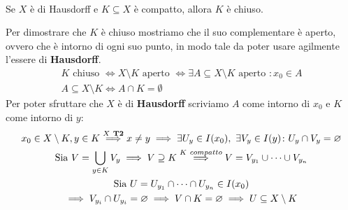 \begin{theorema}~{}\\ \label{compatto in hausdorff chiuso}
Se $X$ è di Hausdorff e $K\subseteq X$ è compatto, allora $K$ è chiuso.
\end{theorema}
\begin{demonstration}
	Per dimostrare che $K$ è chiuso mostriamo che il suo complementare è aperto, ovvero che è intorno di ogni suo punto, in modo tale da poter usare agilmente l'essere di \textbf{Hausdorff}.
		\begin{gather*}
			K \text{ chiuso } \iff X\setminus K \text{ aperto } \iff \exists A\subseteq X\setminus K \text{ aperto } \colon x_0\in A \\
			A\subseteq X\setminus K \iff A\cap K=\emptyset
		\end{gather*}
	Per poter sfruttare che $X$ è di \textbf{Hausdorff} scriviamo $A$ come intorno di $x_0$ e $K$ come intorno di $y$:
		\begin{gather*}
			x_0\in X\setminus K, y\in K \stackrel{X\ \textbf{T2}}{\implies} x\neq y\implies \exists U_y\in I(x_0), \ \exists V_y\in I(y) \colon U_y\cap V_y=\emptyset \\
			\text{Sia } V=\union_{y\in K}V_y \implies V\supseteq K \stackrel{K\ compatto}{\Longrightarrow} V=V_{y_1}\cup\dots\cup V_{y_n}\\
			\text{Sia } U=U_{y_1}\cap\dots\cap U_{y_n} \in I(x_0)\\
			\implies V_{y_i}\cap U_{y_i}=\emptyset \implies V\cap K=\emptyset \implies U\subseteq X\setminus K
		\end{gather*}
\end{demonstration}

